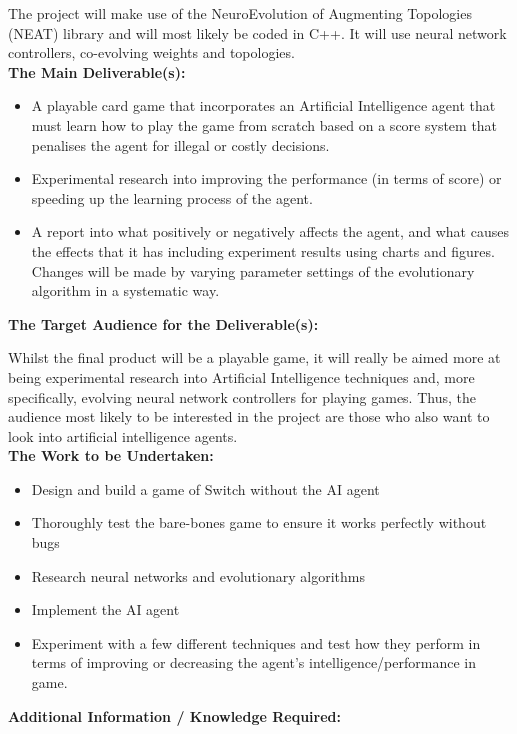 \documentclass[12pt,a4paper]{article}
\begin{document}
\begin{appendices}
The project will make use of the NeuroEvolution of Augmenting Topologies (NEAT) library and will most likely be coded in C++. It will use neural network controllers, co-evolving weights and topologies. \\

\pagebreak
\large{\textbf{The Main Deliverable(s):}}
\begin{itemize}
	\item A playable card game that incorporates an Artificial Intelligence agent that must learn how to play the game from scratch based on a score system that penalises the agent for illegal or costly decisions. 
	\item Experimental research into improving the performance (in terms of score) or speeding up the learning process of the agent. 
	\item A report into what positively or negatively affects the agent, and what causes the effects that it has including experiment results using charts and figures. Changes will be made by varying parameter settings of the evolutionary algorithm in a systematic way.
\end{itemize}

\large{\textbf{The Target Audience for the Deliverable(s):}}

Whilst the final product will be a playable game, it will really be aimed more at being experimental research into Artificial Intelligence techniques and, more specifically, evolving neural network controllers for playing games. Thus, the audience most likely to be interested in the project are those who also want to look into artificial intelligence agents. \\

\pagebreak
\large{\textbf{The Work to be Undertaken:}}
\begin{itemize}
	\item Design and build a game of Switch without the AI agent
	\item Thoroughly test the bare-bones game to ensure it works perfectly without bugs
	\item Research neural networks and evolutionary algorithms
	\item Implement the AI agent
	\item Experiment with a few different techniques and test how they perform in terms of improving or decreasing the agent’s intelligence/performance in game.
\end{itemize} 

\large{\textbf{Additional Information / Knowledge Required:}}


\end{appendices}
\end{document}
